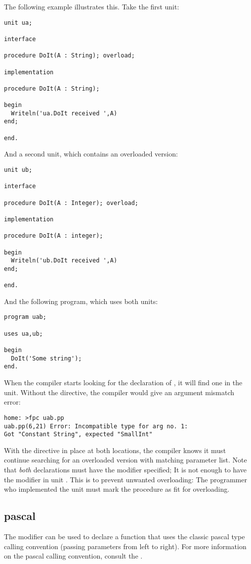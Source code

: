 The following example illustrates this. Take the first unit:
\begin{verbatim}
unit ua;

interface

procedure DoIt(A : String); overload;

implementation

procedure DoIt(A : String);

begin
  Writeln('ua.DoIt received ',A)
end;

end.
\end{verbatim}
And a second unit, which contains an overloaded version:
\begin{verbatim}
unit ub;

interface

procedure DoIt(A : Integer); overload;

implementation

procedure DoIt(A : integer);

begin
  Writeln('ub.DoIt received ',A)
end;

end.
\end{verbatim}
And the following program, which uses both units:
\begin{verbatim}
program uab;

uses ua,ub;

begin
  DoIt('Some string');
end.
\end{verbatim}
When the compiler starts looking for the declaration of , it will
find one in the  unit. Without the  directive, the 
compiler would give an argument mismatch error:
\begin{verbatim}
home: >fpc uab.pp
uab.pp(6,21) Error: Incompatible type for arg no. 1: 
Got "Constant String", expected "SmallInt"
\end{verbatim}
With the  directive in place at both locations, the compiler
knows it must continue searching for an overloaded version with matching
parameter list. Note that {\em both} declarations must have the
 modifier specified; It is not enough to have the modifier in
unit . This is to prevent unwanted overloading: The programmer who
implemented the  unit must mark the procedure as fit for overloading.

%
%
\subsection{pascal}
\label{se:pascal}
The  modifier can be used to declare a function that uses the
classic pascal type calling convention (passing parameters from left to right).
For more information on the pascal calling convention, consult the \progref.

